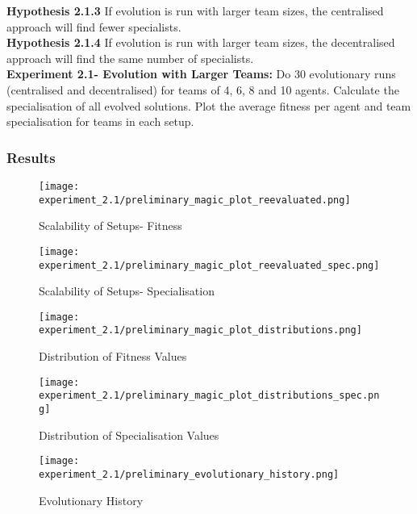 \documentclass[12pt]{article}
\begin{document}
\textbf{Hypothesis 2.1.3} If evolution is run with larger team sizes, the centralised approach will find fewer specialists.\\

\textbf{Hypothesis 2.1.4} If evolution is run with larger team sizes, the decentralised approach will find the same number of specialists.\\

\textbf{Experiment 2.1- Evolution with Larger Teams:} Do 30 evolutionary runs (centralised and decentralised) for teams of 4, 6, 8 and 10 agents.
Calculate the specialisation of all evolved solutions.
Plot the average fitness per agent and team specialisation for teams in each setup. \\

\subsubsection{Results}

\begin{figure}[h]
\centering
\texttt{[image: experiment\_2.1/preliminary\_magic\_plot\_reevaluated.png]}
\caption{Scalability of Setups- Fitness}
\label{fig:preliminary_magic_plot}
\end{figure}

\begin{figure}[h]
\centering
\texttt{[image: experiment\_2.1/preliminary\_magic\_plot\_reevaluated\_spec.png]}
\caption{Scalability of Setups- Specialisation}
\label{fig:preliminary_magic_plot_spec}
\end{figure}

\begin{figure}[h]
\centering
\texttt{[image: experiment\_2.1/preliminary\_magic\_plot\_distributions.png]}
\caption{Distribution of Fitness Values}
\label{fig:preliminary_magic_plot_distribution}
\end{figure}

\begin{figure}[h]
\centering
\texttt{[image: experiment\_2.1/preliminary\_magic\_plot\_distributions\_spec.png]}
\caption{Distribution of Specialisation Values}
\label{fig:preliminary_magic_plot_distribution_spec}
\end{figure}

\begin{figure}[h]
\centering
\texttt{[image: experiment\_2.1/preliminary\_evolutionary\_history.png]}
\caption{Evolutionary History}
\label{fig:preliminary_evo_history}
\end{figure}
\end{document}
